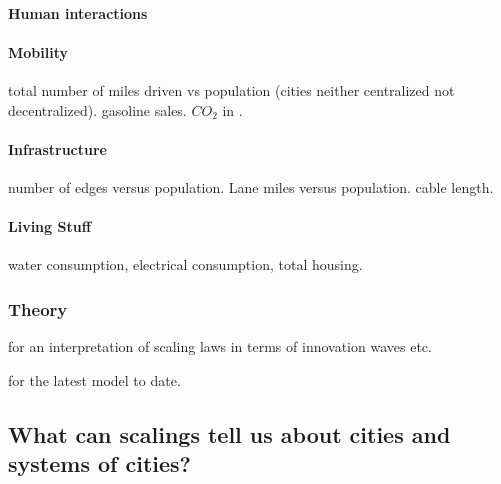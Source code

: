 \paragraph{Human interactions} \cite{Schlapfer:2014}

\paragraph{Mobility} \cite{Samaniego:2008} total number of miles driven vs
population (cities neither centralized not decentralized).
\cite{Bettencourt:2007} gasoline sales. $CO_2$ in \cite{Fragkias:2013,
Oliveira:2014, Rybksi:2013}.

\paragraph{Infrastructure} \cite{Veregin:1997} number of edges versus population.
\cite{Samaniego:2008} Lane miles versus population. \cite{Bettencourt:2007}
cable length.

\paragraph{Living Stuff} \cite{Bettencourt:2007} water consumption, electrical
consumption, total housing.

    \subsubsection{Theory}
    \label{ssub:theory}
    
\cite{Pumain:2006} for an interpretation of scaling laws in terms of
innovation waves etc.

\cite{Bettencourt:2013} for the latest model to date.


\subsection{What can scalings tell us about cities and systems of
cities?}
\label{sub:what_can_scalings_tell_us_about_cities_and_systems_of_cities_}

